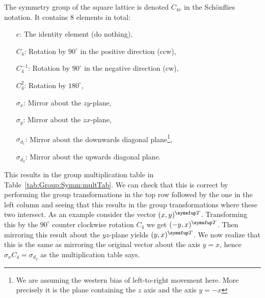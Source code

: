 The symmetry group of the square lattice is denoted $C_{4v}$ in the Sch\"onflies notation. It contains $8$ elements in total:
\begin{itemize}
    \item[$e$:] The identity element (do nothing),
    \item[$C_4$:] Rotation by $90^\circ$ in the positive direction (ccw),
    \item[$C_4^{-1}$:] Rotation by $90^\circ$ in the negative direction (cw),
    \item[$C_4^2$:] Rotation by $180^\circ$,
    \item[$\sigma_x$:] Mirror about the $zy$-plane,
    \item[$\sigma_y$:] Mirror about the $zx$-plane,
    \item[$\sigma_{d_1}$:] Mirror about the downwards diagonal plane\footnote{We are assuming the western bias of left-to-right movement
        here. More precisely it is the plane containing the $z$ axis and the axis $y=-x$},
    \item[$\sigma_{d_2}$:] Mirror about the upwards diagonal plane.
\end{itemize}
This results in the group multiplication table in Table~\ref{tab:Group:Symm:multTab}. We can check that this is correct by
performing the group transformations in the top row followed by the one in the left column and seeing that this results
in the group transformations where these two intersect. As an example consider the vector $(x,y)^\trans$. Transforming this
by the $90^\circ$ counter clockwise rotation $C_4$ we get $(-y,x)^\trans$. Then mirroring this result about the $yz$-plane
yields $(y,x)^\trans$. We now realize that this is the same as mirroring the original vector about the axis $y=x$, hence
$\sigma_xC_4=\sigma_{d_2}$ as the multiplication table says.
